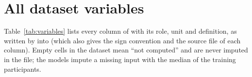 \section{All dataset variables}
\label{app:variables}

Table~\ref{tab:variables} lists every column of  with its role, unit and definition, as
written by  into  (which also gives the sign convention and the source file
of each column). Empty cells in the dataset mean ``not computed'' and are never imputed in the file; the models impute a
missing input with the median of the training participants.



\clearpage

